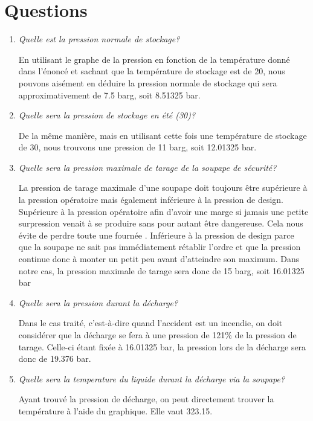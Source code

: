 \section{Questions}
\begin{enumerate}
\item\textit{Quelle est la pression normale de stockage?}

En utilisant le graphe de la pression en fonction de la température donné dans l'énoncé et sachant que la température de stockage est de 20\celsius , nous pouvons aisément en déduire la pression normale de stockage qui sera approximativement de 7.5 barg, soit 8.51325 bar.

\item\textit{Quelle sera la pression de stockage en été (30\celsius)?}

De la même manière, mais en utilisant cette fois une température de stockage de 30\celsius , nous trouvons une pression de 11 barg, soit 12.01325 bar.

\item\textit{Quelle sera la pression maximale de tarage de la soupape de sécurité?}

La pression de tarage maximale d'une soupape doit toujours être supérieure à la pression opératoire mais également inférieure à la pression de design. Supérieure à la pression opératoire afin d'avoir une marge si jamais une petite surpression venait à se produire sans pour autant être dangereuse. Cela nous évite de perdre toute une \og fournée \fg. Inférieure à la pression de design parce que la soupape ne sait pas immédiatement rétablir l'ordre et que la pression continue donc à monter un petit peu avant d'atteindre son maximum. 
Dans notre cas, la pression maximale de tarage sera donc de 15 barg, soit 16.01325 bar 

\item\textit{Quelle sera la pression durant la décharge?}

Dans le cas traité, c'est-à-dire quand l'accident est un incendie, on doit considérer que la décharge se fera à une pression de 121\% de la pression de tarage. Celle-ci étant fixée à 16.01325 bar, la pression lors de la décharge sera donc de 19.376 bar.

\item\textit{Quelle sera la temperature du liquide durant la décharge via la soupape?}

Ayant trouvé la pression de décharge, on peut directement trouver la température à l'aide du graphique. Elle vaut 323.15\kelvin.


\end{enumerate}
